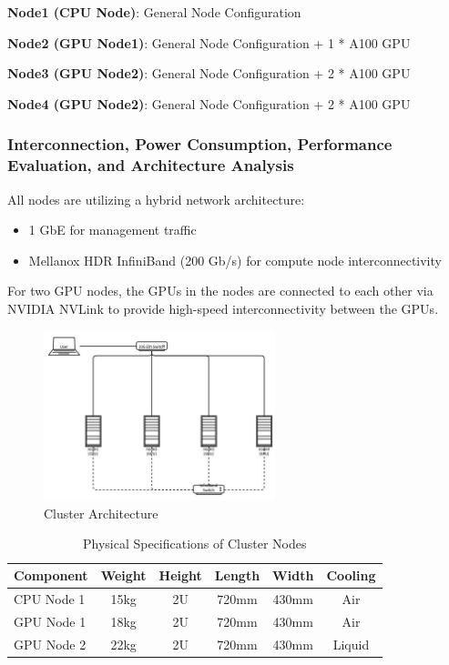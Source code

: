 \documentclass[a4paper,12pt]{article}
\begin{document}
\textbf{Node1 (CPU Node)}: General Node Configuration

\textbf{Node2 (GPU Node1)}: General Node Configuration + 1 * A100 GPU

\textbf{Node3 (GPU Node2)}: General Node Configuration + 2 * A100 GPU

\textbf{Node4 (GPU Node2)}: General Node Configuration + 2 * A100 GPU 

\subsubsection{Interconnection, Power Consumption, Performance Evaluation, and Architecture Analysis}

All nodes are utilizing a hybrid network architecture:
\begin{itemize}
    \item 1 GbE for management traffic
    \item Mellanox HDR InfiniBand (200 Gb/s) for compute node interconnectivity
\end{itemize}

For two GPU nodes, the GPUs in the nodes are connected to each other via NVIDIA NVLink to provide high-speed interconnectivity between the GPUs.

\begin{figure}[H]
    \centering
    \includegraphics[width=0.6\textwidth]{Cluster_Architecture.png}
    \caption{Cluster Architecture}
    \label{fig:cluster_arch}
\end{figure}

\begin{table}[H]
\centering
\vspace{0.5cm}
\begin{tabular}{lccccc}  
\toprule
Component & Weight & Height & Length & Width & Cooling \\
\midrule 
CPU Node 1 & 15kg & 2U & 720mm & 430mm & Air \\
GPU Node 1 & 18kg & 2U & 720mm & 430mm & Air \\
GPU Node 2 & 22kg & 2U & 720mm & 430mm & Liquid \\
\bottomrule
\end{tabular}
\caption{Physical Specifications of Cluster Nodes}
\end{table}
\end{document}
